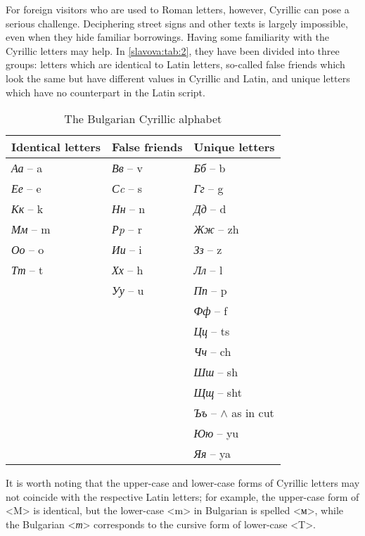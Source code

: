 \documentclass[output=paper]{langscibook}
\begin{document}
For foreign visitors who are used to Roman letters, however, Cyrillic can pose a serious challenge. Deciphering street signs and other texts is largely impossible, even when they hide familiar borrowings. Having some familiarity with the Cyrillic letters may help. In \autoref{slavova:tab:2}, they have been divided into three groups: letters which are identical to Latin letters, so-called false friends which look the same but have different values in Cyrillic and Latin, and unique letters which have no counterpart in the Latin script.

\begin{table}
  \begin{tabular}{lll}\midrule\toprule
    Identical letters &	False friends &	Unique letters \\\midrule
    \textit{Аа} – a & \textit{Вв} – v & \textit{Бб} – b \\
    \textit{Ее} – e & \textit{Сc} – s & \textit{Гг} – g \\
    \textit{Кк} – k & \textit{Нн} – n & \textit{Дд} – d \\
    \textit{Мм} – m & \textit{Рp} – r & \textit{Жж} – zh \\
    \textit{Оо} – o & \textit{Ии} – i & \textit{Зз} – z \\
    \textit{Тт} – t & \textit{Хх} – h & \textit{Лл} – l \\
    & \textit{Уу} – u & \textit{Пп} – p \\
    & & \textit{Фф} – f \\
    & & \textit{Цц} – ts \\
    & & \textit{Чч} – ch \\
    & & \textit{Шш} – sh \\
    & & \textit{Щщ} – sht \\
    & & \textit{Ъъ} – $\wedge$ as in cut \\ 
    & & \textit{Юю} – yu \\
    & & \textit{Яя} – ya \\ \bottomrule\midrule
  \end{tabular}
  \caption{The Bulgarian Cyrillic alphabet}
  \label{slavova:tab:2}
\end{table}

\noindent
It is worth noting that the upper-case and lower-case forms of Cyrillic letters may not coincide with the respective Latin letters; for example, the upper-case form of <M> is identical, but the lower-case <m> in Bulgarian is spelled <м>, while the Bulgarian <\textit{т}> corresponds to the cursive form of lower-case <T>. 
\end{document}
